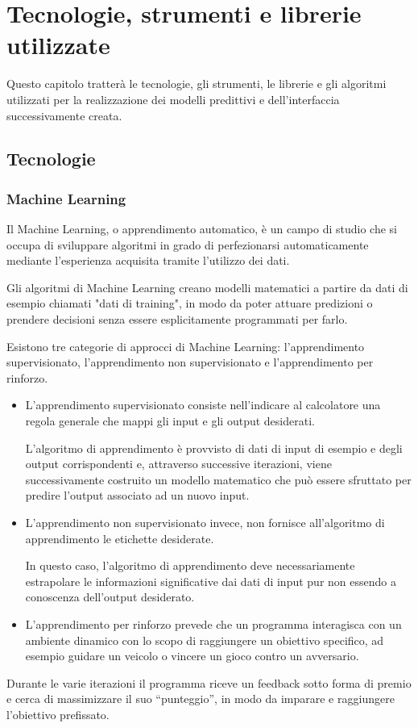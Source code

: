 \chapter{Tecnologie, strumenti e librerie utilizzate}
Questo capitolo tratterà le tecnologie, gli strumenti, le librerie e gli algoritmi utilizzati per la realizzazione dei modelli predittivi e dell’interfaccia successivamente creata. 
\section{Tecnologie}
\subsection{Machine Learning}

Il Machine Learning, o apprendimento automatico, è un campo di studio che si occupa di sviluppare algoritmi in grado di perfezionarsi automaticamente mediante l'esperienza acquisita tramite l'utilizzo dei dati. 

Gli algoritmi di Machine Learning creano modelli matematici a partire da dati di esempio chiamati "dati di training", in modo da poter attuare predizioni o prendere decisioni senza essere esplicitamente programmati per farlo. 

Esistono tre categorie di approcci di Machine Learning: l'apprendimento supervisionato, l'apprendimento non supervisionato e l'apprendimento per rinforzo.
\begin{itemize}
    \item L'apprendimento supervisionato consiste nell’indicare al calcolatore una regola generale che mappi gli input e gli output desiderati. 
    
    L'algoritmo di apprendimento è provvisto di dati di input di esempio e degli output corrispondenti e, attraverso successive iterazioni, viene successivamente costruito un modello matematico che può essere sfruttato per predire l'output associato ad un nuovo input.
    
    \item L'apprendimento non supervisionato invece, non fornisce all'algoritmo di apprendimento le etichette desiderate. 
    
    In questo caso, l'algoritmo di apprendimento deve necessariamente estrapolare le informazioni significative dai dati di input pur non essendo a conoscenza dell'output desiderato.
    
    \item L'apprendimento per rinforzo prevede che un programma interagisca con un ambiente dinamico con lo scopo di raggiungere un obiettivo specifico, ad esempio guidare un veicolo o vincere un gioco contro un avversario. 
\end{itemize}
Durante le varie iterazioni il programma riceve un feedback sotto forma di premio e cerca di massimizzare il suo “punteggio”, in modo da imparare e raggiungere l'obiettivo prefissato.

